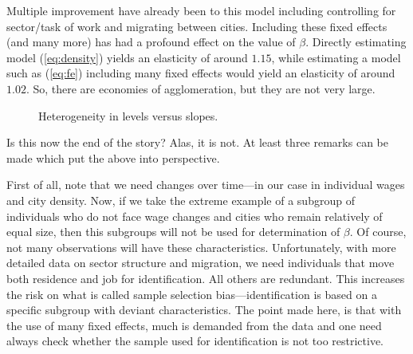 \documentclass[fleqn,10pt]{SelfArx} %
\begin{document}
Multiple improvement have already been to this model including controlling for
sector/task of work and migrating between cities. Including these fixed effects
(and many more) has had a profound effect on the value of $\beta$. Directly
estimating model (\ref{eq:density}) yields an elasticity of around $1.15$,
while estimating a model such as (\ref{eq:fe}) including many fixed effects
would yield an elasticity of around $1.02$. So, there are economies of
agglomeration, but they are not very large.

\begin{figure}[t!]\centering 
	\hfill
	\caption{Heterogeneity in levels versus slopes.}
	\label{fig:heterogeneity}
\end{figure}

Is this now the end of the story? Alas, it is not. At least three remarks can be
made which put the above into perspective.

First of all, note that we need changes over time---in our case in individual wages and
city density. Now, if we take the extreme example of a subgroup of individuals
who do not face wage changes and cities who remain relatively of equal size,
then this subgroups will not be used for determination of $\beta$. Of course,
not many observations will have these characteristics. Unfortunately, with
more detailed data on sector structure and migration, we need individuals that
move both residence and job for identification. All others are redundant. This
increases the risk on what is called sample selection bias---identification is
based on a specific subgroup with deviant characteristics. The point made here,
is that with the use of many fixed effects, much is demanded from the data and
one need always check whether the sample used for identification is not too
restrictive.  
\end{document}
